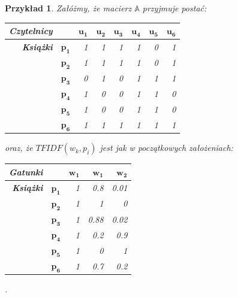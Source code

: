 \documentclass[12pt,a4paper]{report}
\newtheorem{przyklad}{Przykład}[chapter]{\normalfont}
\begin{document}
\begin{przyklad}

Załóżmy, że macierz $\mathbb{A}$ przyjmuje postać:
\begin{center}
\begin{tabular}{|r|r|r|r|r|r|r|r|} \hline
\textbf{Czytelnicy} & & $\mathbf{u_1}$ & $\mathbf{u_2}$ & $\mathbf{u_3}$ & $\mathbf{u_4}$ & $\mathbf{u_5}$ & $\mathbf{u_6}$ \\
\hline
\hline
\textbf{Książki} &$\mathbf{p_1}$ & 1 & 1 & 1 & 1 & 0 & 1 \\
\hline
&$\mathbf{p_2}$ & 1 & 1 & 1 & 1 & 0 & 1 \\
\hline
&$\mathbf{p_3}$ & 0 & 1 & 0 & 1 & 1 & 1 \\
\hline
&$\mathbf{p_4}$ & 1 & 0 & 0 & 1 & 1 & 0 \\
\hline
&$\mathbf{p_5}$ & 1 & 0 & 0 & 1 & 1 & 0 \\
\hline
&$\mathbf{p_6}$ & 1 & 1 & 1 & 1 & 1 & 1 \\
\hline
\end{tabular}
\end{center}

oraz, że $TFIDF(w_k, p_i)$ jest jak w początkowych założeniach:
\begin{center}
\begin{tabular}{|r|r|r|r|r|} \hline
\textbf{Gatunki} & & $\mathbf{w_1}$ &  $\mathbf{w_1}$ & $\mathbf{w_2}$  \\
\hline
\hline
\textbf{Książki} &$\mathbf{p_1}$ & 1 & 0.8 & 0.01 \\
\hline
&$\mathbf{p_2}$ & 1 & 1 & 0  \\
\hline
&$\mathbf{p_3}$ & 1 & 0.88 & 0.02 \\
\hline
&$\mathbf{p_4}$ & 1 & 0.2 & 0.9 \\
\hline
&$\mathbf{p_5}$ & 1 & 0 & 1 \\
\hline
&$\mathbf{p_6}$ & 1 & 0.7 & 0.2 \\
\hline
\end{tabular}.
\end{center}


\end{przyklad}
\end{document}
